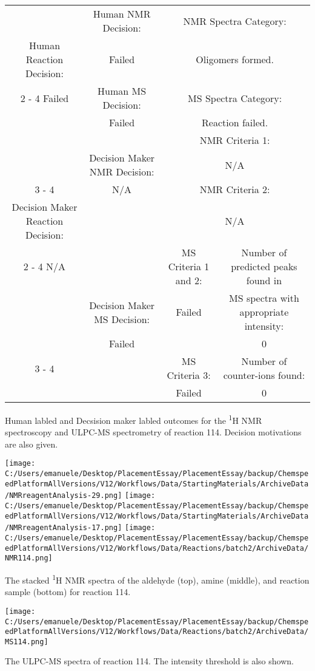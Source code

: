 \documentclass{article}%
\begin{document}
\begin{Decision Table}[H]%
\begin{tabular}{|c|c|c|c|}%
\hline%
&Human NMR Decision:&\multicolumn{2}{|c|}{NMR Spectra Category:}\\%
Human Reaction Decision:&Failed&\multicolumn{2}{|c|}{Oligomers formed.}\\%
\cline{2%
-%
4}%
Failed&Human MS Decision:&\multicolumn{2}{|c|}{MS Spectra Category:}\\%
&Failed&\multicolumn{2}{|c|}{Reaction failed.}\\%
\hline%
&&\multicolumn{2}{|c|}{NMR Criteria 1:}\\%
&Decision Maker NMR Decision:&\multicolumn{2}{|c|}{N/A}\\%
\cline{3%
-%
4}%
&N/A&\multicolumn{2}{|c|}{NMR Criteria 2:}\\%
Decision Maker Reaction Decision:&&\multicolumn{2}{|c|}{N/A}\\%
\cline{2%
-%
4}%
N/A&&MS Criteria 1 and 2:&Number of predicted peaks found in\\%
&Decision Maker MS Decision:&Failed&MS spectra with appropriate intensity:\\%
&Failed&&0\\%
\cline{3%
-%
4}%
&&MS Criteria 3:&Number of counter{-}ions found:\\%
&&Failed&0\\%
\hline%
\end{tabular}%
\caption{Human labled and Decsision maker labled outcomes for the \textsuperscript{1}H NMR spectroscopy and ULPC-MS spectrometry of reaction 114. Decision motivations are also given.}%
\end{Decision Table}%
\begin{NMR Spectra}[H]%
\begin{center}%
\texttt{[image: C:/Users/emanuele/Desktop/PlacementEssay/PlacementEssay/backup/ChemspeedPlatformAllVersions/V12/Workflows/Data/StartingMaterials/ArchiveData/NMRreagentAnalysis-29.png]}\hfill%
\texttt{[image: C:/Users/emanuele/Desktop/PlacementEssay/PlacementEssay/backup/ChemspeedPlatformAllVersions/V12/Workflows/Data/StartingMaterials/ArchiveData/NMRreagentAnalysis-17.png]}\hfill%
\texttt{[image: C:/Users/emanuele/Desktop/PlacementEssay/PlacementEssay/backup/ChemspeedPlatformAllVersions/V12/Workflows/Data/Reactions/batch2/ArchiveData/NMR114.png]}\hfill%
\end{center}%
\caption{The stacked \textsuperscript{1}H NMR spectra of the aldehyde (top), amine (middle), and reaction sample (bottom) for reaction 114.}%
\end{NMR Spectra}%
\begin{MS Spectra}[H]%
\begin{center}%
\texttt{[image: C:/Users/emanuele/Desktop/PlacementEssay/PlacementEssay/backup/ChemspeedPlatformAllVersions/V12/Workflows/Data/Reactions/batch2/ArchiveData/MS114.png]}\hfill%
\end{center}%
\caption{The ULPC-MS spectra of reaction 114. The intensity threshold is also shown.}%
\end{MS Spectra}%
\end{document}
